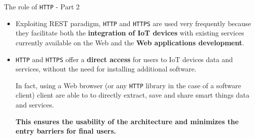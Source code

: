 \documentclass[10pt]{beamer}
\begin{document}
\begin{frame}{The role of \texttt{HTTP} - Part 2}

\begin{itemize}
\justifying
\item Exploiting REST paradigm, \texttt{HTTP} and \texttt{HTTPS} are used very frequently because they facilitate both the \textbf{integration of IoT devices} with existing services currently available on the Web and the  \textbf{Web applications development}.

\item \texttt{HTTP} and \texttt{HTTPS} offer a \textbf{direct access} for users to IoT devices data and services, without the need for installing additional software. 

In fact, using a Web browser (or any \texttt{HTTP} library in the case of a software client) client are able to to directly extract, save and share smart things data and services. 

\textbf{This ensures the usability of the architecture and minimizes the entry barriers for final users.}
\end{itemize}

\end{frame} 
\end{document}
